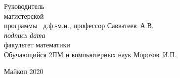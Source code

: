 \begin{titlepage}
\begin{flushleft}
\normalsize %
Руководитель \\
магистерской \\
программы \hspace{0.7cm} \underline{\hspace{2cm}} ~д.ф.-м.н., профессор Савватеев~А.В. \hfill \underline{\hspace{2cm}} \\
\small %
\hspace{3.5cm} \textit{подпись}
\hspace{8.8cm} \textit{дата} \\

\normalsize %
\hspace{6.2cm} факультет математики \\
Обучающийся \hspace{0.5cm} 2ПМ \hspace{1cm} и компьютерных наук \hspace{1.5cm} Морозов~И.П.
\end{flushleft}

\vspace{0.4cm}
\begin{center}
Майкоп 2020
\end{center}
\end{titlepage}